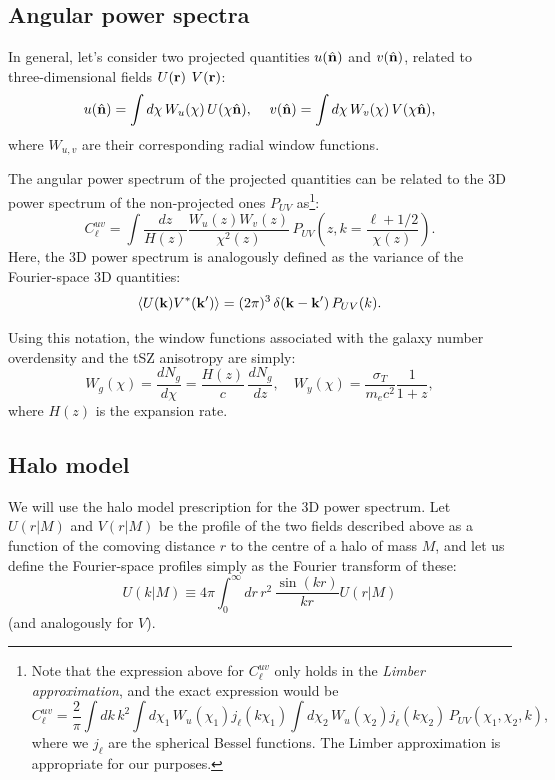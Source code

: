 \documentclass{article}
\newcommand{\nv}{\hat{\bf n}}
\begin{document}
  \subsection{Angular power spectra}
    In general, let's consider two projected quantities $u(\nv)$ and $v(\nv)$, related to three-dimensional fields $U({\bf r})$ $V({\bf r})$:
    \begin{equation}
      u(\nv)=\int d\chi\,W_u(\chi)\,U(\chi\nv),\hspace{12pt} v(\nv)=\int d\chi\,W_v(\chi)\,V(\chi\nv),
    \end{equation}
    where $W_{u,v}$ are their corresponding radial window functions.

    The angular power spectrum of the projected quantities can be related to the 3D power spectrum of the non-projected ones $P_{UV}$ as\footnote{Note that the expression above for $C_\ell^{uv}$ only holds in the \emph{Limber approximation}, and the exact expression would be
    \begin{equation}
      C^{uv}_\ell=\frac{2}{\pi}\int dk\,k^2 \int d\chi_1\,W_u(\chi_1)j_\ell(k\chi_1)\int d\chi_2\,W_u(\chi_2)j_\ell(k\chi_2)\,P_{UV}(\chi_1,\chi_2,k),
    \end{equation}
    where we $j_\ell$ are the spherical Bessel functions. The Limber approximation is appropriate for our purposes.}:
    \begin{equation}
      C_\ell^{uv} = \int \frac{dz}{H(z)} \frac{W_u(z)W_v(z)}{\chi^2(z)}\,P_{UV}\left( z, k=\frac{\ell+1/2}{\chi(z)} \right).
    \end{equation}
    Here, the 3D power spectrum is analogously defined as the variance of the Fourier-space 3D quantities:
    \begin{equation}
      \left\langle U({\bf k})V^*({\bf k}')\right\rangle = (2\pi)^3\,\delta({\bf k}-{\bf k}')\,P_{UV}(k).
    \end{equation}

    Using this notation, the window functions associated with the galaxy number overdensity and the tSZ anisotropy are simply:
    \begin{equation}
      W_g(\chi)=\frac{dN_g}{d\chi}=\frac{H(z)}{c}\,\frac{dN_g}{dz},\hspace{12pt}W_y(\chi)=\frac{\sigma_T}{m_ec^2}\frac{1}{1+z},
    \end{equation}
    where $H(z)$ is the expansion rate.


  \subsection{Halo model}
    We will use the halo model prescription for the 3D power spectrum. Let $U(r|M)$ and $V(r|M)$ be the profile of the two fields described above as a function of the comoving distance $r$ to the centre of a halo of mass $M$, and let us define the Fourier-space profiles simply as the Fourier transform of these:
    \begin{equation}
      U(k|M)\equiv4\pi \int_0^\infty dr\,r^2\,\frac{\sin(kr)}{kr}U(r|M)
    \end{equation}
    (and analogously for $V$).
\end{document}
